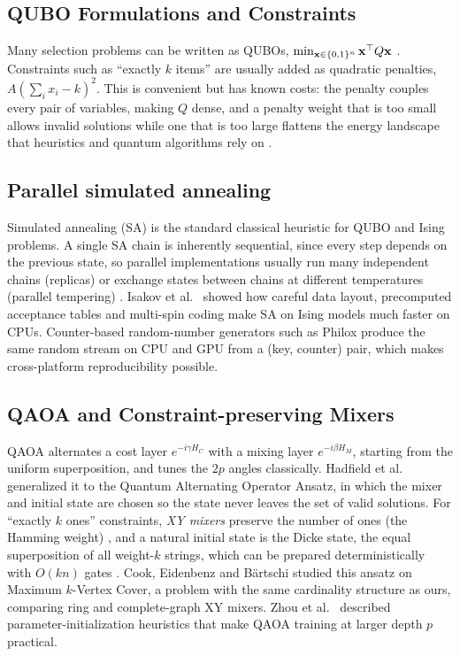 \subsection{QUBO Formulations and Constraints}

Many selection problems can be written as QUBOs, $\min_{\mathbf{x}\in\{0,1\}^n} \mathbf{x}^\top Q \mathbf{x}$ \cite{glover2019tutorial,lucas2014ising}. Constraints such as ``exactly $k$ items'' are usually added as quadratic penalties, $A(\sum_i x_i - k)^2$. This is convenient but has known costs: the penalty couples every pair of variables, making $Q$ dense, and a penalty weight that is too small allows invalid solutions while one that is too large flattens the energy landscape that heuristics and quantum algorithms rely on \cite{glover2019tutorial}.

\subsection{Parallel simulated annealing}

Simulated annealing (SA) \cite{kirkpatrick1983optimization} is the standard classical heuristic for QUBO and Ising problems. A single SA chain is inherently sequential, since every step depends on the previous state, so parallel implementations usually run many independent chains (replicas) or exchange states between chains at different temperatures (parallel tempering) \cite{earl2005parallel}. Isakov et al.\ \cite{isakov2015optimised} showed how careful data layout, precomputed acceptance tables and multi-spin coding make SA on Ising models much faster on CPUs. Counter-based random-number generators such as Philox \cite{salmon2011parallel} produce the same random stream on CPU and GPU from a (key, counter) pair, which makes cross-platform reproducibility possible.

\subsection{QAOA and Constraint-preserving Mixers}

QAOA \cite{farhi2014qaoa} alternates a cost layer $e^{-i\gamma H_C}$ with a mixing layer $e^{-i\beta H_M}$, starting from the uniform superposition, and tunes the $2p$ angles classically. Hadfield et al.\ \cite{hadfield2019qaoa} generalized it to the Quantum Alternating Operator Ansatz, in which the mixer and initial state are chosen so the state never leaves the set of valid solutions. For ``exactly $k$ ones'' constraints, \emph{XY mixers} preserve the number of ones (the Hamming weight) \cite{wang2020xy}, and a natural initial state is the Dicke state, the equal superposition of all weight-$k$ strings, which can be prepared deterministically with $O(kn)$ gates \cite{bartschi2019dicke}. Cook, Eidenbenz and B\"artschi \cite{cook2020kvertex} studied this ansatz on Maximum $k$-Vertex Cover, a problem with the same cardinality structure as ours, comparing ring and complete-graph XY mixers. Zhou et al.\ \cite{zhou2020qaoa} described parameter-initialization heuristics that make QAOA training at larger depth $p$ practical.

